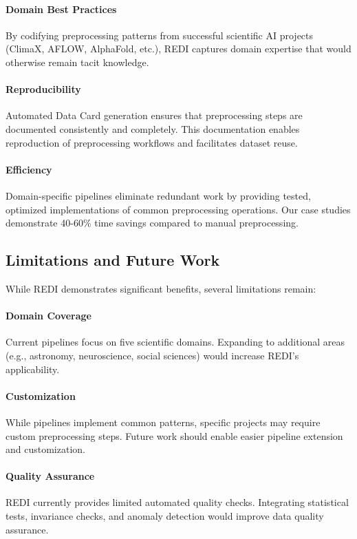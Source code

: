 \documentclass[11pt,letterpaper,twocolumn]{article}
\begin{document}
\paragraph{Domain Best Practices}
By codifying preprocessing patterns from successful scientific AI projects (ClimaX, AFLOW, AlphaFold, etc.), REDI captures domain expertise that would otherwise remain tacit knowledge.

\paragraph{Reproducibility}
Automated Data Card generation ensures that preprocessing steps are documented consistently and completely. This documentation enables reproduction of preprocessing workflows and facilitates dataset reuse.

\paragraph{Efficiency}
Domain-specific pipelines eliminate redundant work by providing tested, optimized implementations of common preprocessing operations. Our case studies demonstrate 40-60\% time savings compared to manual preprocessing.

\subsection{Limitations and Future Work}

While REDI demonstrates significant benefits, several limitations remain:

\paragraph{Domain Coverage}
Current pipelines focus on five scientific domains. Expanding to additional areas (e.g., astronomy, neuroscience, social sciences) would increase REDI's applicability.

\paragraph{Customization}
While pipelines implement common patterns, specific projects may require custom preprocessing steps. Future work should enable easier pipeline extension and customization.

\paragraph{Quality Assurance}
REDI currently provides limited automated quality checks. Integrating statistical tests, invariance checks, and anomaly detection would improve data quality assurance.
\end{document}
